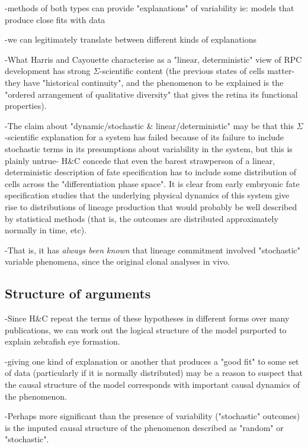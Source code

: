 -methods of both types can provide "explanations" of variability ie: models that produce close fits with data

-we can legitimately translate between different kinds of explanations

-What Harris and Cayouette characterise as a "linear, deterministic" view of RPC development has strong $\Sigma$-scientific content (the previous states of cells matter- they have "historical continuity", and the phenomenon to be explained is the "ordered arrangement of qualitative diversity" that gives the retina its functional properties).

-The claim about "dynamic/stochastic \& linear/deterministic" may be that this $\Sigma$-scientific explanation for a system has failed because of its failure to include stochastic terms in its presumptions about variability in the system, but this is plainly untrue- H\&C concede that even the barest strawperson of a linear, deterministic description of fate specification has to include some distribution of cells across the "differentiation phase space". It is clear from early embryonic fate specification studies that the underlying physical dynamics of this system give rise to distributions of lineage production that would probably be well described by statistical methods (that is, the outcomes are distributed approximately normally in time, etc).

-That is, it has \textit{always been known} that lineage commitment involved "stochastic" variable phenomena, since the original clonal analyses in vivo.

\subsection{Structure of arguments}

-Since H\&C repeat the terms of these hypotheses in different forms over many publications, we can work out the logical structure of the model purported to explain zebrafish eye formation.

-giving one kind of explanation or another that produces a "good fit" to some set of data (particularly if it is normally distributed) may be a reason to suspect that the causal structure of the model corresponds with important causal dynamics of the phenomenon. 

-Perhaps more significant than the presence of variability ("stochastic" outcomes) is the imputed causal structure of the phenomenon described as "random" or "stochastic". 


